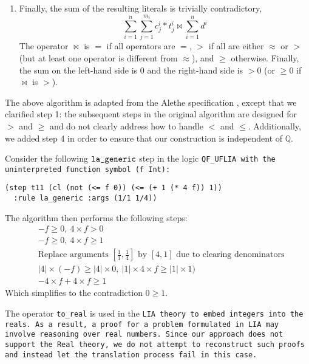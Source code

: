 \begin{enumerate}
    \item Finally, the sum of the resulting literals is trivially contradictory,
    \[
        \sum_{i=1}^{n}\sum_{j=1}^{m_i} c_j^i*t_j^i \bowtie \sum_{i=1}^{n}d^i
    \]
  The operator $\bowtie$ is $=$ if all operators are $=$, $>$ if all are either $\approx$ or $>$ (but at least one operator is different from $\approx$), and $\geq$ otherwise. Finally, the sum on the left-hand side is $0$ and the right-hand side is $>0$ (or $\geq 0$ if $\bowtie$ is $>$).

\end{enumerate}

The above algorithm is adapted from the Alethe specification \cite{alethespec}, except that we clarified step 1: the subsequent steps in the original algorithm are designed for $>$ and $\geq$ and do not clearly address how to handle $<$ and $\leq$.
Additionally, we added step 4 in order to ensure that our construction is independent of $\mathbb{Q}$.

\begin{example}
Consider the following $\tt{la\_generic}$ step in the logic \tt{QF\_UFLIA} with the uninterpreted function symbol \lstinline[language=SMT,basicstyle=\ttfamily\upshape]|(f Int)|:
\begin{lstlisting}[language=SMT,label={lst:lageneric-example}]
(step t11 (cl (not (<= f 0)) (<= (+ 1 (* 4 f)) 1))
  :rule la_generic :args (1/1 1/4))
\end{lstlisting} 
%
The algorithm then performs the following steps: %
\begin{align}
&- f \geq 0,~ 4 \times f > 0 \label{eq:step2}\tag{Steps 1 and 2}\\
&- f \geq 0,~ 4 \times f \geq 1 \label{eq:step3}\tag{Step 3}\\
&\text{Replace arguments } [\frac{1}{1}, \frac{1}{4}] \text{ by } [4, 1] \text{ due to clearing denominators} \label{eq:step4}\tag{Step 4}\\
&|4| \times (- f) \geq |4| \times 0, ~ |1| \times 4 \times f \geq |1| \times 1) \label{eq:step5}\tag{Step 5} \\
&-4 \times f + 4 \times f \geq 1 \label{eq:step6}\tag{Step 6}
\end{align}
Which simplifies to the contradiction  $0 \geq 1$.
\label{ex:la_generic_example_red}
\end{example}

\begin{remark}
The operator \lstinline[language=SMT,basicstyle=\ttfamily\footnotesize]{to_real} is used in the \tt{LIA} theory to embed integers into the reals.
As a result, a proof for a problem formulated in \tt{LIA} may involve reasoning over real numbers.
Since our approach does not support the \lstinline[language=SMT,basicstyle=\ttfamily\footnotesize\upshape]{Real} theory, we do not attempt to reconstruct such proofs and instead let the translation process fail in this case.
\end{remark}

